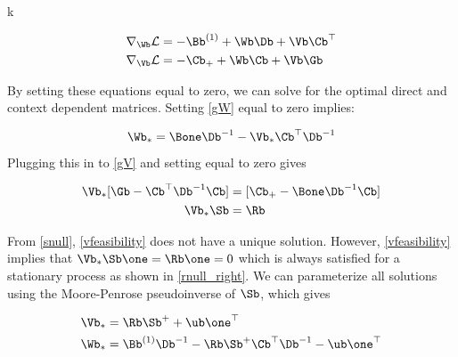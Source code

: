 k\documentclass{article}
\begin{document}
\begin{align}
     \nabla_{\Wb}\mathcal{L} &= - \Bb^{(1)}+\Wb \Db + \Vb \Cb^\top \label{gW}\\ 
     \nabla_{\Vb}\mathcal{L} &= - \Cb_{+} + \Wb\Cb + \Vb \Gb \label{gV}
\end{align}

By setting these equations equal to zero, we can solve for the optimal direct and context dependent matrices. Setting \eqref{gW} equal to zero implies:

\begin{align}
    \Wb_* &= \Bone \Db^{-1} - \Vb_*\Cb^\top \Db^{-1} \\  
\end{align}
Plugging this in to \eqref{gV} and setting equal to zero gives

\begin{align}
    \Vb_*[\Gb - \Cb^\top \Db^{-1}\Cb] &= [\Cb_+ - \Bone \Db^{-1}\Cb] \\
    \Vb_* \Sb &= \Rb \label{vfeasibility}
\end{align}

From \eqref{snull}, \eqref{vfeasibility} does not have a unique solution. However, \eqref{vfeasibility} implies that $\Vb_*\Sb\one = \Rb\one=0$ which is always satisfied for a stationary process as shown in \eqref{rnull_right}. We can parameterize all solutions using the Moore-Penrose pseudoinverse of $\Sb$, which gives 

\begin{align}
    \Vb_{*} &= \Rb\Sb^+ + \ub\one^\top \label{vstar}\\
    \Wb_{*} &= \Bb^{(1)}\Db^{-1} - \Rb \Sb^+ \Cb^\top \Db^{-1} - \ub\one^\top\label{wstar}
\end{align}
\end{document}
